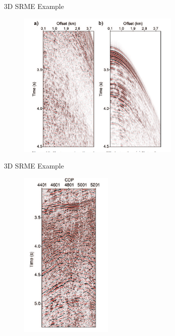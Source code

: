 \documentclass[xcolor=dvipsnames,notes]{beamer}
\begin{document}
\begin{frame}{3D SRME Example}
\begin{figure}
\includegraphics[width=0.7\textwidth]{Fig/fig6.png}
\end{figure}
\end{frame}
\begin{frame}{3D SRME Example}
\begin{figure}
\includegraphics[width=0.4\textwidth]{Fig/fig7.png}
\end{figure}
\end{frame}
\end{document}
